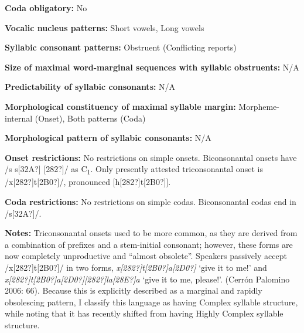 \begin{styleBody}
\textbf{Coda obligatory:} No
\end{styleBody}

\begin{styleBody}
\textbf{Vocalic nucleus patterns:} Short vowels, Long vowels
\end{styleBody}

\begin{styleBody}
\textbf{Syllabic consonant patterns:} Obstruent (Conflicting reports)
\end{styleBody}

\begin{styleBody}
\textbf{Size of maximal word{}-marginal sequences with syllabic obstruents:} N/A
\end{styleBody}

\begin{styleBody}
\textbf{Predictability of syllabic consonants:} N/A
\end{styleBody}

\begin{styleBody}
\textbf{Morphological constituency of maximal syllable margin:} Morpheme-internal (Onset), Both patterns (Coda)
\end{styleBody}

\begin{styleBody}
\textbf{Morphological pattern of syllabic consonants:} N/A
\end{styleBody}

\begin{styleBody}
\textbf{Onset restrictions: }No restrictions on simple onsets. Biconsonantal onsets have /s s[32A?] [282?]/ as C\textsubscript{1}. Only presently attested triconsonantal onset is /x[282?]t[2B0?]/, pronounced [h[282?]t[2B0?]].
\end{styleBody}

\begin{styleBody}
\textbf{Coda restrictions: }No restrictions on simple codas. Biconsonantal codas end in /s[32A?]/.
\end{styleBody}

\begin{styleBody}
\textbf{Notes:} Triconsonantal onsets used to be more common, as they are derived from a combination of prefixes and a stem-initial consonant; however, these forms are now completely unproductive and “almost obsolete”. Speakers passively accept /x[282?]t[2B0?]/ in two forms, \textit{x[282?]t[2B0?]a[2D0?]} ‘give it to me!’ and \textit{x[282?]t[2B0?]a[2D0?][282?]la[28E?]a} ‘give it to me, please!’. (Cerrón Palomino 2006: 66). Because this is explicitly described as a marginal and rapidly obsolescing pattern, I classify this language as having Complex syllable structure, while noting that it has recently shifted from having Highly Complex syllable structure.
\end{styleBody}

